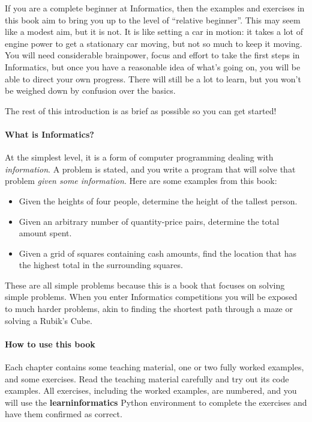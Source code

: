

If you are a complete beginner at Informatics, then the examples and exercises in this
book aim to bring you up to the level of ``relative beginner''. This may seem like a
modest aim, but it is not. It is like setting a car in motion: it takes a lot of engine
power to get a stationary car moving, but not so much to keep it moving. You will need
considerable brainpower, focus and effort to take the first steps in Informatics, but once
you have a reasonable idea of what's going on, you will be able to direct your own
progress. There will still be a lot to learn, but you won't be weighed down by confusion
over the basics.

The rest of this introduction is as brief as possible so you can get started!

\paragraph{What is Informatics?} At the simplest level, it is a form of computer programming
dealing with \emph{information}. A problem is stated, and you write a program that will
solve that problem \emph{given some information}. Here are some examples from this book:
\begin{itemize}
  \item Given the heights of four people, determine the height of the tallest person.
  \item Given an arbitrary number of quantity-price pairs, determine the total amount
    spent.
  \item Given a grid of squares containing cash amounts, find the location that has the
    highest total in the surrounding squares.
\end{itemize}

These are all simple problems because this is a book that focuses on solving simple
problems. When you enter Informatics competitions you will be exposed to much harder
problems, akin to finding the shortest path through a maze or solving a Rubik's Cube.

\paragraph{How to use this book} Each chapter contains some teaching material, one or two
fully worked examples, and some exercises. Read the teaching material carefully and try
out its code examples. All exercises, including the worked examples, are numbered, and you
will use the \textbf{learninformatics} Python environment to complete the exercises and
have them confirmed as correct.


